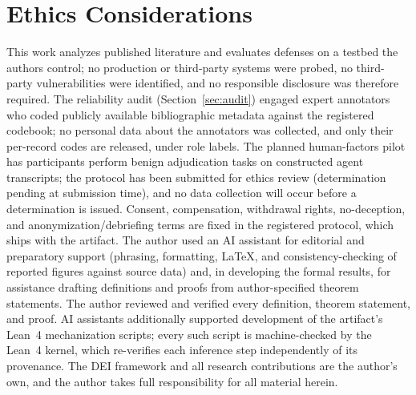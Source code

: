 \documentclass[conference]{IEEEtran}
\begin{document}
\section*{Ethics Considerations}
This work analyzes published literature and evaluates defenses on
a testbed the authors control; no production or third-party
systems were probed, no third-party vulnerabilities were
identified, and no responsible disclosure was therefore required.
The reliability audit (Section~\ref{sec:audit}) engaged expert
annotators who coded publicly available bibliographic metadata
against the registered codebook; no personal data about the
annotators was collected, and only their per-record codes are
released, under role labels. The planned human-factors pilot
has participants perform benign adjudication tasks on constructed
agent transcripts; the protocol has been submitted for ethics
review (determination pending at submission time), and no data
collection will occur before a determination is issued. Consent,
compensation, withdrawal rights, no-deception, and
anonymization/debriefing terms are fixed in the registered
protocol, which ships with the artifact. The author used an AI
assistant for editorial and preparatory support (phrasing,
formatting, \LaTeX{}, and consistency-checking of reported figures
against source data) and, in developing the formal results, for
assistance drafting definitions and proofs from author-specified
theorem statements. The author reviewed and verified every
definition, theorem statement, and proof. AI assistants
additionally supported development of the artifact's Lean~4
mechanization scripts; every such script is machine-checked by the
Lean~4 kernel, which re-verifies each inference step independently
of its provenance. The DEI framework and all
research contributions are the author's own, and the author takes
full responsibility for all material herein.
\end{document}
